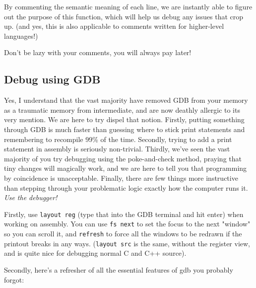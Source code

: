 \documentclass[11pt]{article}
\begin{document}
By commenting the semantic meaning of each line, we are instantly able to figure out the
purpose of this function, which will help us debug any issues that crop up. (and yes, this
is also applicable to comments written for higher-level languages!)

Don't be lazy with your comments, you will always pay later!

\subsection{Debug using GDB}

Yes, I understand that the vast majority have removed GDB from your memory as a traumatic
memory from intermediate, and are now deathly allergic to its very mention. We are here to
try dispel that notion. Firstly, putting something through GDB is much faster than
guessing where to stick print statements and remembering to recompile 99\% of the time.
Secondly, trying to add a print statement in assembly is seriously non-trivial. Thirdly,
we've seen the vast majority of you try debugging using the poke-and-check method, praying
that tiny changes will magically work, and we are here to tell you that programming by
coincidence is unacceptable. Finally, there are few things more instructive than stepping
through your problematic logic exactly how the computer runs it. \emph{Use the debugger!}

Firstly, use \texttt{layout reg} (type that into the GDB terminal and hit enter) when
working on assembly. You can use \texttt{fs next} to set the focus to the next "window" so
you can scroll it, and \texttt{refresh} to force all the windows to be redrawn if the
printout breaks in any ways. (\texttt{layout src} is the same, without the register view,
and is quite nice for debugging normal C and C++ source).

Secondly, here's a refresher of all the essential features of gdb you probably forgot:
\end{document}
